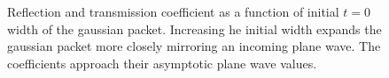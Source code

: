 \documentclass[singlepage,notitlepage,nofootinbib,11pt]{revtex4-1}
\begin{document}
\begin{figure}[h]
  \centering
  \captionsetup[subfigure]{labelformat=empty}
  \caption{\label{sigmas} Reflection and transmission coefficient as a function of initial $t=0$ width of the gaussian packet. Increasing he initial width expands the gaussian packet more closely mirroring an incoming plane wave. The coefficients approach their asymptotic plane wave values.}
\end{figure}


\clearpage
\end{document}
